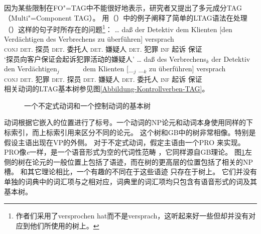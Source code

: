 因为某些限制在FO"=TAG中不能很好地表示\citep[--50]{Rambow94a}，研究者又提出了多元成分TAG（Multi"=Component TAG）。
\citet*{JBR2000a}用（）中的例子阐释了简单的LTAG语法在处理（）这样的句子时所存在的问题\footnote{%
  作者们采用了versprochen hat而不是versprach，这听起来好一些但却并没有对应到他们所使用的树上。
}：
\eal
\ex 
\gll \ldots{} daß  der        Detektiv  dem        Klienten [den Verdächtigen des Verbrechens zu überführen] versprach\\
{}  \textsc{conj}  \textsc{det}.\nom{} 探员 \textsc{det}.\dat{} 委托人   \spacebr{}\textsc{det}.\acc{} 嫌疑人 \textsc{det}.\gen{} 犯罪 \textsc{inf} 起诉 保证\\
  \glt `探员向客户保证会起诉犯罪活动的嫌疑人'
\ex\label{Beispiel-Joshi-NP4} 
\gll \ldots{} daß  des        Verbrechens$_k$ der        Detektiv  den Verdächtigen$_j$~~~~~~ dem         Klienten [\_$_j$ \_$_k$ zu überführen] versprach\\
{}     \textsc{conj}  \textsc{det}.\gen{} 犯罪           \textsc{det}.\nom{} 探员 \textsc{det}.\acc{} 嫌疑人   \textsc{det}.\dat{}  委托人   {}      {}     \textsc{inf} 起诉  保证\\
\zl
相关动词的LTAG基本树参见图\vref{Abbildung-Kontrollverben-TAG}。
\begin{figure}
\oneline{%
\begin{forest}
tag, baseline
[S
	[NP$_2^2\downarrow$]
	[S
		[NP$_2^1\downarrow$]
		[S
			[NP
				[PRO]]
			[VP
				[NP$_2^1$
					[e]]
				[NP$_2^2$
					[e]]
				[V$_2$
					[zu überführen;\textsc{inf} 起诉]]]]]]
\end{forest}
\begin{forest}
tag, baseline
[S
	[NP$_1^1\downarrow$]
	[VP
		[NP$_1^2\downarrow$]
		[S*]
		[V$_1$
		[versprach;保证]]]]
\end{forest}
}
\caption{\label{Abbildung-Kontrollverben-TAG}一个不定式动词和一个控制动词的基本树} 
\end{figure}%
动词根据它嵌入的位置进行了标号。一个动词的NP论元和动词本身使用同样的下标索引，而上标索引用来区分不同的论元。
这个树和GB\indexgbc 中的树非常相像。特别是假设主语出现在VP的外侧。
对于不定式动词，假定主语由一个PRO
来实现。PRO像\emph{e}一样，是一个语音形式为空的代词性范畴
，它同样源自GB理论。
图\ref{Abbildung-Kontrollverben-TAG}左侧的树在论元的一般位置上包括了语迹，而在树的更高层的位置包括了相关的NP槽。
和其它理论相比，一个有趣的不同在于这些语迹
只存在于树上。
它们并没有单独的词典中的词汇项与之相对应，词典里的词汇项均只包含有语音形式的词及其基本树。

